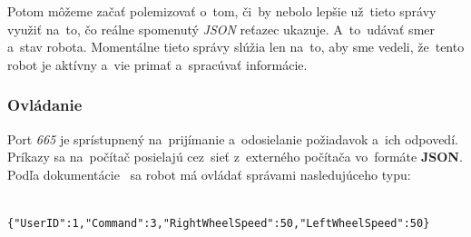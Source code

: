 	Potom môžeme začať polemizovať o~tom, či~by nebolo lepšie už~tieto správy využiť na~to, čo reálne
	spomenutý \textit{JSON} reťazec ukazuje. A~to~udávať smer a~stav robota. Momentálne tieto správy slúžia len na~to,
	aby sme vedeli, že~tento robot je aktívny a~vie primať a~spracúvať informácie.

\subsubsection{Ovládanie}
\label{sec:ovladanie}

	Port \textit{665} je sprístupnený na~prijímanie a~odosielanie požiadavok a~ich odpovedí. Príkazy sa na~počítač posielajú cez~sieť z~externého
	počítača vo~formáte \textbf{JSON}. Podľa dokumentácie~\cite{BMdoc} sa robot má ovládať správami nasledujúceho typu:

	\label{jsonSpeedRequestBad}
	\begin{lstlisting}
			{"UserID":1,"Command":3,"RightWheelSpeed":50,"LeftWheelSpeed":50}
	\end{lstlisting}

